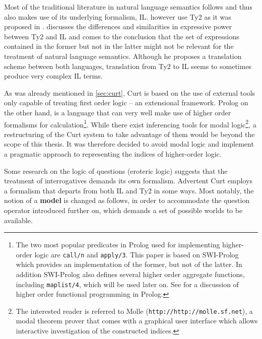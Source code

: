 \documentclass[a4paper]{article}
\newcommand{\abbr}{\textsf} %
\newcommand{\term}[1]{\textsf{\textbf{#1}}} %
\newcommand{\code}[1]{\texttt{#1}} %
\newcommand{\pn}{\textsf} %
\newcommand{\url}[1]{\code{http://#1}} %
\newcommand{\curt}{\pn{Curt}}
\newcommand{\acurt}{\pn{Advertent Curt}}
\newcommand{\prol}{\pn{Prolog}}
\theoremstyle{remark}
\theoremstyle{remark}
\theoremstyle{definition}
\theoremstyle{definition}
\begin{document}
Most of the traditional literature in natural language semantics follows
\cite{ptq} and thus also makes use of its underlying formalism,
\abbr{IL}. \cite{gs:sqpa} however use \abbr{Ty2} as it was
proposed in \cite{gallin:ty2}. \cite{z:ilty2} discusses the differences and
similarities in expressive power between \abbr{Ty2} and \abbr{IL} and comes to
the conclusion that the set of expressions contained in the former but not in
the latter might not be relevant for the treatment of natural language
semantics. Although he proposes a translation scheme between both languages,
translation from \abbr{Ty2} to \abbr{IL} seems to sometimes produce very complex
\abbr{IL} terms.

As was already mentioned in \ref{sec:curt}, \curt{} is based on 
the use of external tools only capable of treating first order logic – an
extensional framework. \prol{} on the other hand, is a language that can very well
make use of higher order formalisms for calculation\footnote{The two most
popular predicates in \prol{} used for implementing higher-order logic are
\code{call/n} and \code{apply/3}. This paper is based on \pn{SWI-Prolog} which
provides an implementation of the former, but not of the latter. In addition
\pn{SWI-Prolog} also defines several higher order aggregate functions, including
\code{maplist/4}, which will be used later on. See \cite{naish:prolhio} for a
discussion of higher order functional programming in \prol.}.  While there exist
inferencing tools for modal logic\footnote{ The interested reader is referred to
\pn{Molle} (\url{http://molle.sf.net}), a modal theorem prover that comes with a
graphical user interface which allows interactive investigation of the
constructed indices.}, a restructuring of the \curt{} system to take advantage
of them would be beyond the scope of this thesis.  It was therefore decided to
avoid modal logic and implement a pragmatic approach to representing the indices
of higher-order logic.

Some research on the logic of questions (eroteric logic) suggests that the
treatment of interrogatives demands its own formalism.  \acurt{} employs a
formalism that departs from both \abbr{IL} and \abbr{Ty2} in some ways. Most
notably, the notion of a \term{model} is changed as follows, in order to
accommodate the question operator introduced further on, which demands a set of
possible worlds to be available.
\end{document}
